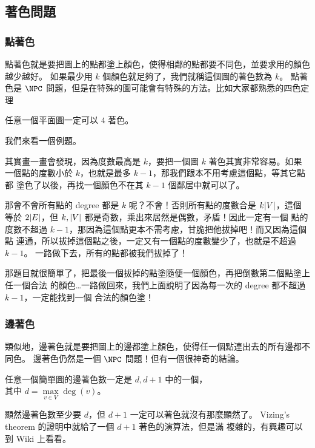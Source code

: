 \documentclass[a4paper,12pt]{book}
\begin{document}
\subsection{著色問題}
\subsubsection{點著色}
點著色就是要把圖上的點都塗上顏色，使得相鄰的點都要不同色，並要求用的顏色越少越好。
如果最少用 $k$ 個顏色就足夠了，我們就稱這個圖的著色數為 $k$。
點著色是 $\NPC$ 問題，但是在特殊的圖可能會有特殊的方法。比如大家都熟悉的四色定理

\begin{theorem}[四色定理]
  任意一個平面圖一定可以 $4$ 著色。
\end{theorem}

我們來看一個例題。

其實畫一畫會發現，因為度數最高是 $k$，要把一個圖 $k$ 著色其實非常容易。如果
一個點的度數小於 $k$，也就是最多 $k-1$，那我們跟本不用考慮這個點，等其它點都
塗色了以後，再找一個顏色不在其 $k-1$ 個鄰居中就可以了。

那會不會所有點的 degree 都是 $k$ 呢？不會！否則所有點的度數合是 $k\lvert V \rvert$，這個
等於 $2 \lvert E \rvert$，但 $k, \lvert V \rvert$ 都是奇數，乘出來居然是偶數，矛盾！因此一定有一個
點的度數不超過 $k-1$，那因為這個點更本不需考慮，甘脆把他拔掉吧！而又因為這個點
連通，所以拔掉這個點之後，一定又有一個點的度數變少了，也就是不超過 $k-1$。
一路做下去，所有的點都被我們拔掉了！

那題目就很簡單了，把最後一個拔掉的點塗隨便一個顏色，再把倒數第二個點塗上任一個合法
的顏色…一路做回來，我們上面說明了因為每一次的 degree 都不超過 $k-1$，一定能找到一個
合法的顏色塗！

\subsubsection{邊著色}
類似地，邊著色就是要把圖上的邊都塗上顏色，使得任一個點連出去的所有邊都不同色。
邊著色仍然是一個 $\NPC$ 問題！但有一個很神奇的結論。

\begin{theorem}
  任意一個簡單圖的邊著色數一定是 $d, d+1$ 中的一個，\\
  其中 $d = \max\limits_{v \in V} \deg(v)$。
\end{theorem}

顯然邊著色數至少要 $d$，但 $d+1$ 一定可以著色就沒有那麼顯然了。
Vizing's theorem 的證明中就給了一個 $d+1$ 著色的演算法，但是滿
複雜的，有興趣可以到 Wiki 上看看。
\end{document}
